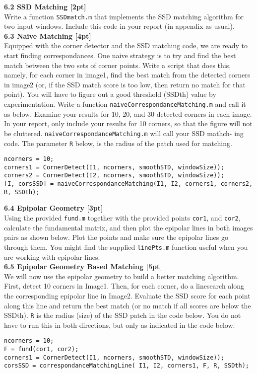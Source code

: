 \documentclass{assignment}
\begin{document}
\begin{problemlist}
\textbf{6.2 SSD Matching [2pt]}\\
Write a function \texttt{SSDmatch.m} that implements the SSD matching algorithm for two input windows. Include this code in your report (in appendix as usual).\\

\textbf{6.3 Naive Matching [4pt]}\\
Equipped with the corner detector and the SSD matching code, we are ready to start finding correspondances. One naive strategy is to try and find the best match between the two sets of corner points. Write a script that does this, namely, for each corner in image1, find the best match from the detected corners in image2 (or, if the SSD match score is too low, then return no match for that point). You will have to figure out a good threshold (SSDth) value by experimentation. Write a function \texttt{naiveCorrespondanceMatching.m} and call it as below. Examine your results for 10, 20, and 30 detected corners in each image. In your report, only include your results for 10 corners, so that the figure will not be cluttered. \texttt{naiveCorrespondanceMatching.m} will call your SSD mathch- ing code. The parameter \texttt{R} below, is the radius of the patch used for matching.\\
\begin{lstlisting}
ncorners = 10;
corners1 = CornerDetect(I1, ncorners, smoothSTD, windowSize));
corners2 = CornerDetect(I2, ncorners, smoothSTD, windowSize));
[I, corsSSD] = naiveCorrespondanceMatching(I1, I2, corners1, corners2, R, SSDth);
\end{lstlisting}

\textbf{6.4 Epipolar Geometry [3pt]}\\
Using the provided \texttt{fund.m} together with the provided points \texttt{cor1}, and \texttt{cor2}, calculate the fundamental matrix, and then plot the epipolar lines in both images pairs as shown below. Plot the points and make sure the epipolar lines go through them. You might find the supplied \texttt{linePts.m} function useful when you are working with epipolar lines.\\

\textbf{6.5 Epipolar Geometry Based Matching [5pt]}\\
We will now use the epipolar geometry to build a better matching algorithm. First, detect 10 corners in Image1. Then, for each corner, do a linesearch along the corresponding epipolar line in Image2. Evaluate the SSD score for each point along this line and return the best match (or no match if all scores are below the SSDth). \texttt{R} is the radius (size) of the SSD patch in the code below. You do not have to run this in both directions, but only as indicated in the code below.\\
\begin{lstlisting}
ncorners = 10;
F = fund(cor1, cor2);
corners1 = CornerDetect(I1, ncorners, smoothSTD, windowSize));
corsSSD = correspondanceMatchingLine( I1, I2, corners1, F, R, SSDth);
\end{lstlisting}


\end{problemlist}
\end{document}

